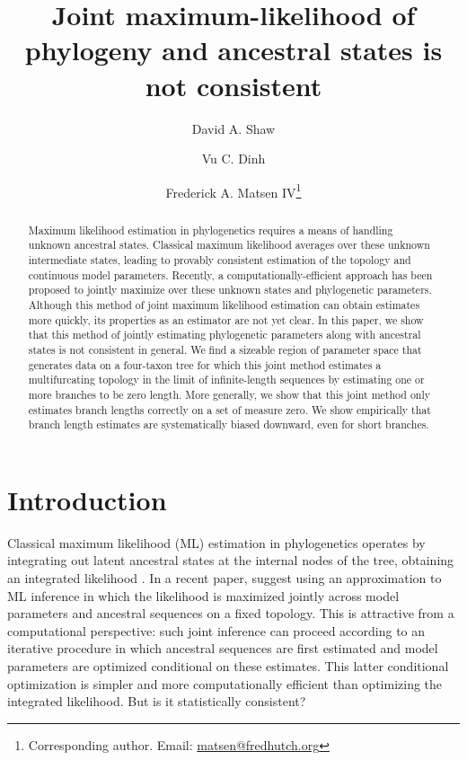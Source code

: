 \documentclass[11pt]{article}
\title{Joint maximum-likelihood of phylogeny and ancestral states is not consistent}
\author[1]{David A. Shaw}
\author[2]{Vu C. Dinh}
\author[1]{Frederick A. Matsen IV\thanks{Corresponding author. Email: \url{matsen@fredhutch.org}}}
\affil[1]{Computational Biology Program, Fred Hutchinson Cancer Research Center\\ Seattle, WA, USA}
\affil[2]{Department of Mathematical Sciences, University of Delaware\\ Newark, DE, USA}
\date{}
\begin{document}
\renewcommand{\arraystretch}{1.2} %

\maketitle

\begin{abstract}
Maximum likelihood estimation in phylogenetics requires a means of handling unknown ancestral states.
Classical maximum likelihood averages over these unknown intermediate states, leading to provably consistent estimation of the topology and continuous model parameters.
Recently, a computationally-efficient approach has been proposed to jointly maximize over these unknown states and phylogenetic parameters.
Although this method of joint maximum likelihood estimation can obtain estimates more quickly, its properties as an estimator are not yet clear.
In this paper, we show that this method of jointly estimating phylogenetic parameters along with ancestral states is not consistent in general.
We find a sizeable region of parameter space that generates data on a four-taxon tree for which this joint method estimates a multifurcating topology in the limit of infinite-length sequences by estimating one or more branches to be zero length.
More generally, we show that this joint method only estimates branch lengths correctly on a set of measure zero.
We show empirically that branch length estimates are systematically biased downward, even for short branches.
\end{abstract}

\newpage

\section*{Introduction}

Classical maximum likelihood (ML) estimation in phylogenetics operates by integrating out latent ancestral states at the internal nodes of the tree, obtaining an integrated likelihood \citep{Goldman1990-dk}.
In a recent paper, \citet{Sagulenko2018-xl} suggest using an approximation to ML inference in which the likelihood is maximized jointly across model parameters and ancestral sequences on a fixed topology.
This is attractive from a computational perspective: such joint inference can proceed according to an iterative procedure in which ancestral sequences are first estimated and model parameters are optimized conditional on these estimates.
This latter conditional optimization is simpler and more computationally efficient than optimizing the integrated likelihood.
But is it statistically consistent?
\end{document}
